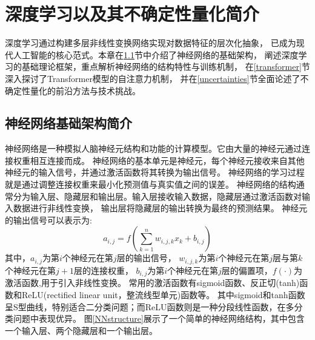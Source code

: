 \chapter{深度学习以及其不确定性量化简介}

深度学习通过构建多层非线性变换网络实现对数据特征的层次化抽象，
已成为现代人工智能的核心范式。本章在\ref{intro-NN}节中介绍了神经网络的基础架构，
阐述深度学习的基础理论框架，重点解析神经网络的结构特性与训练机制，
在\ref{transformer}节深入探讨了Transformer模型的自注意力机制，
并在\ref{uncertainties}节全面论述了不确定性量化的前沿方法与技术挑战。

\section{神经网络基础架构简介}\label{intro-NN}

神经网络是一种模拟人脑神经元结构和功能的计算模型。它由大量的神经元通过连接权重相互连接而成。
神经网络的基本单元是神经元，每个神经元接收来自其他神经元的输入信号，并通过激活函数将其转换为输出信号。
神经网络的学习过程就是通过调整连接权重来最小化预测值与真实值之间的误差。
神经网络的结构通常分为输入层、隐藏层和输出层。输入层接收输入数据，隐藏层通过激活函数对输入数据进行非线性变换，
输出层将隐藏层的输出转换为最终的预测结果。
神经元的输出信号可以表示为:
\begin{equation}
  a_{i,j} = f\left(\sum_{k=1}^{n} w_{i,j,k} x_k + b_{i,j}\right)
\end{equation}
其中，$a_{i,j}$为第$i$个神经元在第$j$层的输出信号，
$w_{i,j,k}$为第$i$个神经元在第$j$层与第$k$个神经元在第$j+1$层的连接权重，
$b_{i,j}$为第$i$个神经元在第$j$层的偏置项，$f(\cdot)$为激活函数,用于引入非线性变换。
常用的激活函数有sigmoid函数、反正切(tanh)函数和ReLU(rectified linear unit，整流线型单元)函数等。
其中sigmoid和tanh函数呈S型曲线，特别适合二分类问题；而ReLU函数则是一种分段线性函数，在多分类问题中表现优异。
图\ref{NNstructure}展示了一个简单的神经网络结构，其中包含一个输入层、两个隐藏层和一个输出层。

